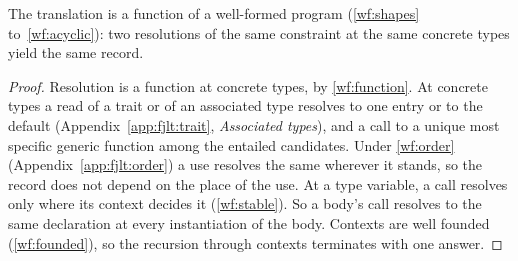 \begin{theorem}[Coherence]
\label{thm:coherence}
The translation is a function of a well-formed program (\ref{wf:shapes} to~\ref{wf:acyclic}): two resolutions of the same constraint at the same concrete types yield the same record.
\end{theorem}
\begin{proof}
Resolution is a function at concrete types, by \ref{wf:function}.
At concrete types a read of a trait or of an associated type resolves to one entry or to the default (Appendix~\ref{app:fjlt:trait}, \emph{Associated types}), and a call to a unique most specific generic function among the entailed candidates.
Under \ref{wf:order} (Appendix~\ref{app:fjlt:order}) a use resolves the same wherever it stands, so the record does not depend on the place of the use.
At a type variable, a call resolves only where its context decides it (\ref{wf:stable}).
So a body's call resolves to the same declaration at every instantiation of the body.
Contexts are well founded (\ref{wf:founded}), so the recursion through contexts terminates with one answer.


\end{proof}
